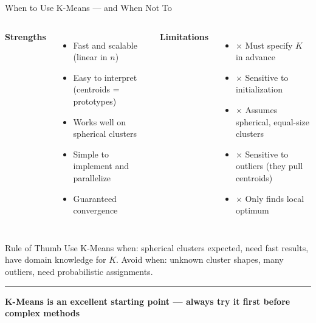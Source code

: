 \documentclass[8pt,aspectratio=169]{beamer}
\newcommand{\bottomnote}[1]{%
\vfill
\vspace{-2mm}
\textcolor{mllavender2}{\rule{\textwidth}{0.4pt}}
\vspace{1mm}
\footnotesize
\textbf{#1}
}
\newenvironment{compactlist}{%
  \begin{itemize}%
    \setlength{\itemsep}{2pt}%
    \setlength{\parskip}{0pt}%
    \setlength{\parsep}{0pt}%
}{%
  \end{itemize}%
}
\begin{document}
\begin{frame}[t]{When to Use K-Means --- and When Not To}
\begin{columns}[T]
\small
\textcolor{mlgreen}{\textbf{Strengths}}

\footnotesize
\begin{compactlist}
\item \footnotesize \textcolor{mlgreen}{\checkmark} Fast and scalable (linear in $n$)
\item \footnotesize \textcolor{mlgreen}{\checkmark} Easy to interpret (centroids = prototypes)
\item \footnotesize \textcolor{mlgreen}{\checkmark} Works well on spherical clusters
\item \footnotesize \textcolor{mlgreen}{\checkmark} Simple to implement and parallelize
\item \footnotesize \textcolor{mlgreen}{\checkmark} Guaranteed convergence
\end{compactlist}

\small
\textcolor{mlred}{\textbf{Limitations}}

\footnotesize
\begin{compactlist}
\item \footnotesize \textcolor{mlred}{$\times$} Must specify $K$ in advance
\item \footnotesize \textcolor{mlred}{$\times$} Sensitive to initialization
\item \footnotesize \textcolor{mlred}{$\times$} Assumes spherical, equal-size clusters
\item \footnotesize \textcolor{mlred}{$\times$} Sensitive to outliers (they pull centroids)
\item \footnotesize \textcolor{mlred}{$\times$} Only finds local optimum
\end{compactlist}
\end{columns}

\vspace{3mm}
\begin{block}{Rule of Thumb}
\footnotesize Use K-Means when: spherical clusters expected, need fast results, have domain knowledge for $K$. Avoid when: unknown cluster shapes, many outliers, need probabilistic assignments.
\end{block}
\bottomnote{K-Means is an excellent starting point --- always try it first before complex methods}
\end{frame}
\end{document}
